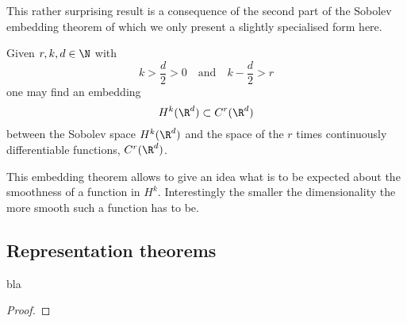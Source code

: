 This rather surprising result is a consequence of the second part of
the Sobolev embedding theorem
of which we only present a slightly specialised form  here.
\begin{thm}
	Given $r, k, d \in \N$ with
	\[ k > \frac{d}{2} > 0 \quad \text{and} \quad k -\frac{d}{2} > r \]
	one may find an embedding
	\[ H^k(\R^d) \subset C^r(\R^d) \]
	between the Sobolev space $H^k(\R^d)$ and the space of the $r$ times
	continuously differentiable functions, $C^r(\R^d)$.
\end{thm}
This embedding theorem allows to give an idea what is to be expected about
the smoothness of a function in $H^k$.
Interestingly the smaller the dimensionality the more smooth such a function
has to be.

\subsection{Representation theorems}

\begin{thm}
	\label{thm:Riesz}
	bla
	\begin{proof}
	\end{proof}
\end{thm}
